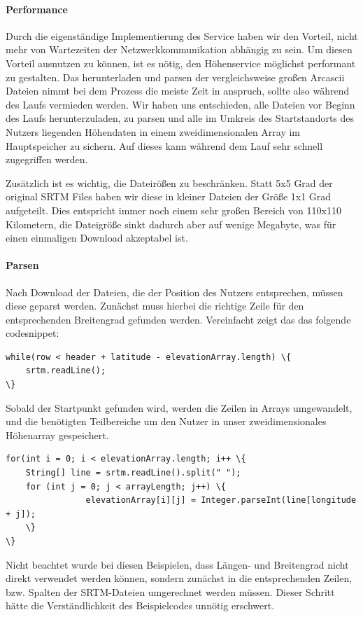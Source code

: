 \paragraph{Performance}
Durch die eigenständige Implementierung des Service haben wir den Vorteil, nicht mehr von Wartezeiten der Netzwerkkommunikation abhängig zu sein. Um diesen Vorteil ausnutzen zu können, ist es nötig, den Höhenservice möglichst performant zu gestalten. Das herunterladen und parsen der vergleichsweise großen Arcascii Dateien nimmt bei dem Prozess die meiste Zeit in anspruch, sollte also während des Laufs vermieden werden. Wir haben uns entschieden, alle Dateien vor Beginn des Laufs herunterzuladen, zu parsen und alle im Umkreis des Startstandorts des Nutzers liegenden Höhendaten in einem zweidimensionalen Array im Hauptspeicher zu sichern. Auf dieses kann während dem Lauf sehr schnell zugegriffen werden.

Zusätzlich ist es wichtig, die Dateirößen zu beschränken. Statt 5x5 Grad der original SRTM Files haben wir diese in kleiner Dateien der Größe 1x1 Grad aufgeteilt. Dies entspricht immer noch einem sehr großen Bereich von 110x110 Kilometern, die Dateigröße sinkt dadurch aber auf wenige Megabyte, was für einen einmaligen Download akzeptabel ist.
\paragraph{Parsen}
Nach Download der Dateien, die der Position des Nutzers entsprechen, müssen diese geparst werden. Zunächst muss hierbei die richtige Zeile für den entsprechenden Breitengrad gefunden werden. Vereinfacht zeigt das das folgende codesnippet:
\lstset{language=java}
\begin{lstlisting}[frame=htrbl, caption={Finden der ersten benötigten Zeile}, breaklines=true]
while(row < header + latitude - elevationArray.length) \{
	srtm.readLine();
\}
\end{lstlisting}
Sobald der Startpunkt gefunden wird, werden die Zeilen in Arrays umgewandelt, und die benötigten Teilbereiche um den Nutzer in unser zweidimensionales Höhenarray gespeichert.
\lstset{language=java}
\begin{lstlisting}[frame=htrbl, caption={Füllen des Höhenarrays}, breaklines=true]
for(int i = 0; i < elevationArray.length; i++ \{
	String[] line = srtm.readLine().split(" ");
	for (int j = 0; j < arrayLength; j++) \{
                elevationArray[i][j] = Integer.parseInt(line[longitude + j]);
	\}
\}
\end{lstlisting}
Nicht beachtet wurde bei diesen Beispielen, dass Längen- und Breitengrad nicht direkt verwendet werden können, sondern zunächst in die entsprechenden Zeilen, bzw. Spalten der SRTM-Dateien umgerechnet werden müssen. Dieser Schritt hätte die Verständlichkeit des Beispielcodes unnötig erschwert.

